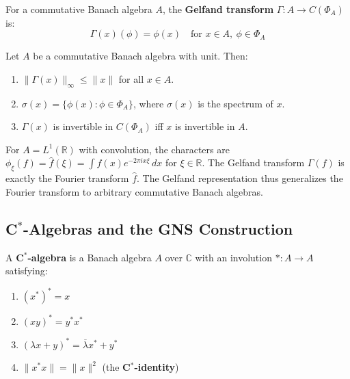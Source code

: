 \begin{definition}
For a commutative Banach algebra $A$, the \textbf{Gelfand transform} $\Gamma: A \to C(\Phi_A)$ is:
\[
\Gamma(x)(\phi) = \phi(x) \quad \text{for } x \in A,\ \phi \in \Phi_A
\]
\end{definition}

\begin{theorem}
Let $A$ be a commutative Banach algebra with unit. Then:
\begin{enumerate}
    \item $\|\Gamma(x)\|_\infty \leq \|x\|$ for all $x \in A$.
    \item $\sigma(x) = \{\phi(x) : \phi \in \Phi_A\}$, where $\sigma(x)$ is the spectrum of $x$.
    \item $\Gamma(x)$ is invertible in $C(\Phi_A)$ iff $x$ is invertible in $A$.
\end{enumerate}
\end{theorem}

\begin{example}
For $A = L^1(\mathbb{R})$ with convolution, the characters are $\phi_\xi(f) = \hat{f}(\xi) = \int f(x) e^{-2\pi i x\xi}\,dx$ for $\xi \in \mathbb{R}$. The Gelfand transform $\Gamma(f)$ is exactly the Fourier transform $\hat{f}$. The Gelfand representation thus generalizes the Fourier transform to arbitrary commutative Banach algebras.
\end{example}

\subsection{C\texorpdfstring{$^*$}{}-Algebras and the GNS Construction}

\begin{definition}[C$^*$-Algebra]
A \textbf{C$^*$-algebra} is a Banach algebra $A$ over $\mathbb{C}$ with an involution $*: A \to A$ satisfying:
\begin{enumerate}
    \item $(x^*)^* = x$
    \item $(xy)^* = y^* x^*$
    \item $(\lambda x + y)^* = \overline{\lambda} x^* + y^*$
    \item $\|x^* x\| = \|x\|^2$ \quad (the \textbf{C$^*$-identity})
\end{enumerate}
\end{definition}

